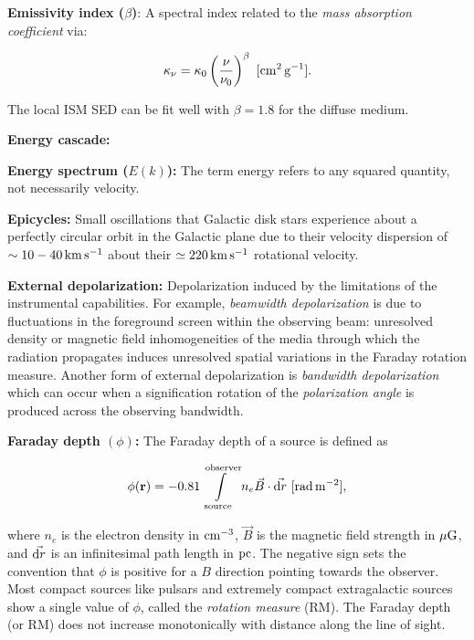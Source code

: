 \documentclass[a4paper,10pt]{article}
\begin{document}
{\noindent}\textbf{Emissivity index ($\beta$)}: A spectral index related to the \textit{mass absorption coefficient} via:

\begin{align*}
    \kappa_\nu = \kappa_0 \left(\frac{\nu}{\nu_0}\right)^\beta ~ [{\rm cm^2\,g^{-1}}].
\end{align*}

{\noindent}The local ISM SED can be fit well with $\beta = 1.8$ for the diffuse medium.

{\noindent}\textbf{Energy cascade:}

{\noindent}\textbf{Energy spectrum ($E(k)$):} The term energy refers to any squared quantity, not necessarily velocity.

{\noindent}\textbf{Epicycles:} Small oscillations that Galactic disk stars experience about a perfectly circular orbit in the Galactic plane due to their velocity dispersion of $\sim10-40\,{\rm km\,s^{-1}}$ about their $\simeq220\,{\rm km\,s^{-1}}$ rotational velocity.

{\noindent}\textbf{External depolarization:} Depolarization induced by the limitations of the instrumental capabilities. For example, \textit{beamwidth depolarization} is due to fluctuations in the foreground screen within the observing beam: unresolved density or magnetic field inhomogeneities of the media through which the radiation propagates induces unresolved spatial variations in the Faraday rotation measure. Another form of external depolarization is \textit{bandwidth depolarization} which can occur when a signification rotation of the \textit{polarization angle} is produced across the observing bandwidth.

{\noindent}\textbf{Faraday depth $(\phi)$:} The Faraday depth of a source is defined as

\begin{align*}
    \phi(\mathbf{r}) = -0.81 \int\limits_\mathrm{source}^\mathrm{observer}n_e\vec{B}\cdot\vec{{\rm d}r} ~ [{\rm rad\,m^{-2}}],
\end{align*}

{\noindent}where $n_e$ is the electron density in ${\rm cm^{-3}}$, $\vec{B}$ is the magnetic field strength in $\mu{\rm G}$, and $\vec{{\rm d}r}$ is an infinitesimal path length in ${\rm pc}$. The negative sign sets the convention that $\phi$ is positive for a $B$ direction pointing towards the observer. Most compact sources like pulsars and extremely compact extragalactic sources show a single value of $\phi$, called the \textit{rotation measure} (RM). The Faraday depth (or RM) does not increase monotonically with distance along the line of sight.
\end{document}

